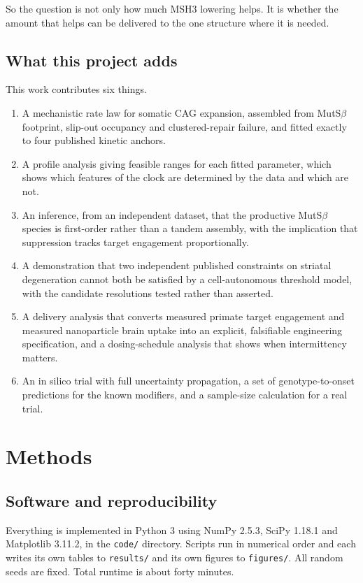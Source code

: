 \documentclass[conference]{IEEEtran}
\begin{document}
So the question is not only how much MSH3 lowering helps. It is whether the amount that helps can be delivered to the one structure where it is needed.

\subsection{What this project adds}
\label{sec:1.6}
This work contributes six things.

\begin{enumerate}
\item A mechanistic rate law for somatic CAG expansion, assembled from MutS$\beta$ footprint, slip-out occupancy and clustered-repair failure, and fitted exactly to four published kinetic anchors.
\item A profile analysis giving feasible ranges for each fitted parameter, which shows which features of the clock are determined by the data and which are not.
\item An inference, from an independent dataset, that the productive MutS$\beta$ species is first-order rather than a tandem assembly, with the implication that suppression tracks target engagement proportionally.
\item A demonstration that two independent published constraints on striatal degeneration cannot both be satisfied by a cell-autonomous threshold model, with the candidate resolutions tested rather than asserted.
\item A delivery analysis that converts measured primate target engagement and measured nanoparticle brain uptake into an explicit, falsifiable engineering specification, and a dosing-schedule analysis that shows when intermittency matters.
\item An in silico trial with full uncertainty propagation, a set of genotype-to-onset predictions for the known modifiers, and a sample-size calculation for a real trial.
\end{enumerate}

\section{Methods}
\label{sec:2}
\subsection{Software and reproducibility}
\label{sec:2.1}
Everything is implemented in Python 3 using NumPy 2.5.3, SciPy 1.18.1 and Matplotlib 3.11.2, in the \texttt{code/\allowbreak{}} directory. Scripts run in numerical order and each writes its own tables to \texttt{results/\allowbreak{}} and its own figures to \texttt{figures/\allowbreak{}}. All random seeds are fixed. Total runtime is about forty minutes.
\end{document}
